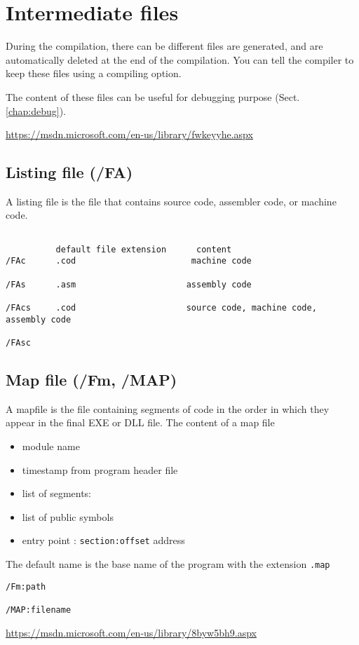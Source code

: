 \section{Intermediate files}

During the compilation, there can be different files are generated, and are
automatically deleted at the end of the compilation.
You can tell the compiler to keep these files using a compiling option.

The content of these files can be useful for debugging purpose
(Sect.\ref{chap:debug}).

\url{https://msdn.microsoft.com/en-us/library/fwkeyyhe.aspx}

\subsection{Listing file (/FA)}
\label{sec:Listing_file_/FA}


A listing file is the file that contains source code, assembler code, or machine code.

\begin{verbatim}

          default file extension      content
/FAc      .cod                       machine code
 
/FAs      .asm                      assembly code

/FAcs     .cod                      source code, machine code, assembly code

/FAsc
\end{verbatim}

\subsection{Map file (/Fm, /MAP)}


A mapfile is the file containing segments of code in the order in which they appear in the final EXE or DLL file.
The content of a map file
\begin{itemize}
  \item module name
  \item timestamp from program header file
  \item list of segments: 
  \item list of public symbols
  \item entry point : \verb!section:offset! address
\end{itemize}

The default name is the base name of the program with the extension \verb!.map!
\begin{verbatim}
/Fm:path

/MAP:filename
\end{verbatim}
\url{https://msdn.microsoft.com/en-us/library/8byw5bh9.aspx}

